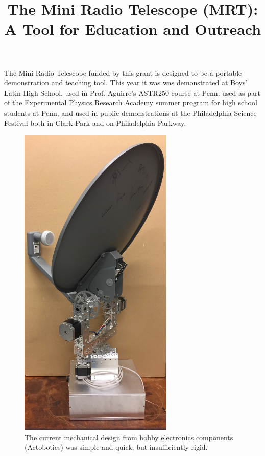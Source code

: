 \documentclass[11pt,letterpaper]{spie}
\title{The Mini Radio Telescope (MRT):\\
A Tool for Education and Outreach}
\begin{document}
\maketitle

The Mini Radio Telescope funded by this grant is designed to be a portable demonstration and teaching tool.  This year it was was demonstrated at Boys' Latin High School, used in Prof. Aguirre's ASTR250 course at Penn, used as part of the Experimental Physics Research Academy summer program for high school students at Penn, and used in public demonstrations at the Philadelphia Science Festival both in Clark Park and on Philadelphia Parkway.

\begin{figure}[h]
\centering
\includegraphics[height=6in]{new_box.jpeg}
\vspace{5pt}
\caption{The current mechanical design from hobby electronics components (Actobotics) was simple and quick, but insufficiently rigid.
}
\label{fig:Devices}
\end{figure}
\end{document}
